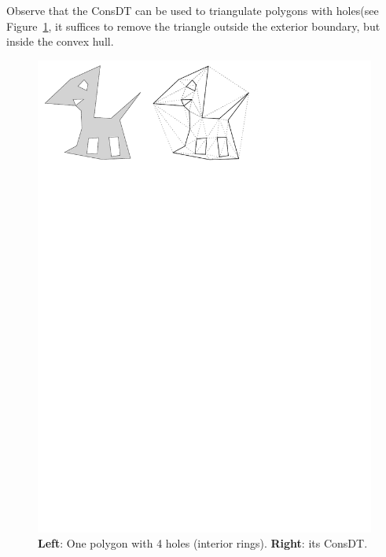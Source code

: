 %

Observe that the ConsDT can be used to triangulate polygons with holes(see Figure~\ref{fig:cdt_dog}, it suffices to remove the triangle outside the exterior boundary, but inside the convex hull.
\begin{figure}
  \centering
  \includegraphics[width=0.6\linewidth]{figs/cdt_dog}
  \caption{\textbf{Left}: One polygon with 4 holes (interior rings). \textbf{Right}: its ConsDT.}
\label{fig:cdt_dog}
\end{figure}


%
